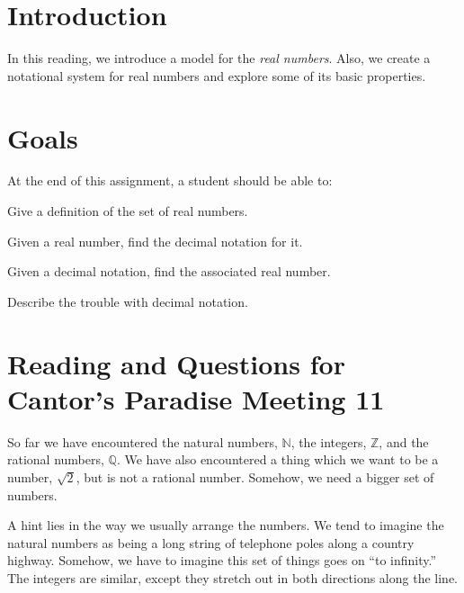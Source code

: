 \documentclass[12pt,letterpaper]{article}
\theoremstyle{definition}
\begin{document}
\setlength{\parskip}{1ex plus 0.5ex minus 0.2ex}
\setlength{\parindent}{0pt}

\pagestyle{fancy}
\cfoot{}

\section*{Introduction}
In this reading, we introduce a model for the \emph{real numbers}. Also, we create a notational system for real numbers and explore some of its basic properties.

\section*{Goals}
At the end of this assignment, a student should be able to:
\begin{compactitem}
\item Give a definition of the set of real numbers.
\item Given a real number, find the decimal notation for it.
\item Given a decimal notation, find the associated real number.
\item Describe the trouble with decimal notation.
\end{compactitem}

\section*{Reading and Questions for Cantor's Paradise Meeting 11}

So far we have encountered the natural numbers, $\mathbb{N}$, the integers, $\mathbb{Z}$, and the rational numbers, $\mathbb{Q}$. 
We have also encountered a thing which we want to be a number, $\sqrt{2}$, but is not a rational number.
Somehow, we need a bigger set of numbers.

A hint lies in the way we usually arrange the numbers.
We tend to imagine the natural numbers as being a long string of telephone poles along a country highway.
Somehow, we have to imagine this set of things goes on ``to infinity.''
The integers are similar, except they stretch out in both directions along the line.
\end{document}
